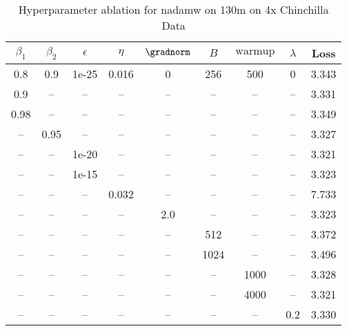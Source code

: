 \begin{table}[h!]
\centering
\caption{Hyperparameter ablation for nadamw on 130m on 4x Chinchilla Data}
\label{tab:ablation_nadamw_130m_on_4x_chinchilla_data}
\begin{tabular}{ccccccccc}
\toprule
$\beta_1$ & $\beta_2$ & $\epsilon$ & $\eta$ & $\gradnorm$ & $B$ & $\mathrm{warmup}$ & $\lambda$ & Loss \\
\midrule
0.8 & 0.9 & 1e-25 & 0.016 & 0 & 256 & 500 & 0 & 3.343 \\
\midrule
0.9 & -- & -- & -- & -- & -- & -- & -- & 3.331 \\
0.98 & -- & -- & -- & -- & -- & -- & -- & 3.349 \\
-- & 0.95 & -- & -- & -- & -- & -- & -- & 3.327 \\
-- & -- & 1e-20 & -- & -- & -- & -- & -- & 3.321 \\
-- & -- & 1e-15 & -- & -- & -- & -- & -- & 3.323 \\
-- & -- & -- & 0.032 & -- & -- & -- & -- & 7.733 \\
-- & -- & -- & -- & 2.0 & -- & -- & -- & 3.323 \\
-- & -- & -- & -- & -- & 512 & -- & -- & 3.372 \\
-- & -- & -- & -- & -- & 1024 & -- & -- & 3.496 \\
-- & -- & -- & -- & -- & -- & 1000 & -- & 3.328 \\
-- & -- & -- & -- & -- & -- & 4000 & -- & 3.321 \\
-- & -- & -- & -- & -- & -- & -- & 0.2 & 3.330 \\
\bottomrule
\end{tabular}
\end{table}

